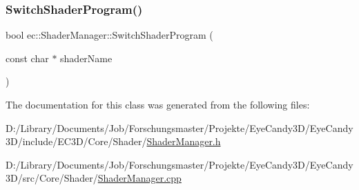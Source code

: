 \mbox{\label{classec_1_1_shader_manager_a19b4d35481ff18573de99722c62064b0}} 
\subsubsection{\texorpdfstring{Switch\+Shader\+Program()}{SwitchShaderProgram()}}
{\footnotesize\ttfamily bool ec\+::\+Shader\+Manager\+::\+Switch\+Shader\+Program (\begin{DoxyParamCaption}\item[{const char $\ast$}]{shader\+Name }\end{DoxyParamCaption})}



The documentation for this class was generated from the following files\+:\begin{DoxyCompactItemize}
\item 
D\+:/\+Library/\+Documents/\+Job/\+Forschungsmaster/\+Projekte/\+Eye\+Candy3\+D/\+Eye\+Candy3\+D/include/\+E\+C3\+D/\+Core/\+Shader/\mbox{\hyperlink{_shader_manager_8h}{Shader\+Manager.\+h}}\item 
D\+:/\+Library/\+Documents/\+Job/\+Forschungsmaster/\+Projekte/\+Eye\+Candy3\+D/\+Eye\+Candy3\+D/src/\+Core/\+Shader/\mbox{\hyperlink{_shader_manager_8cpp}{Shader\+Manager.\+cpp}}\end{DoxyCompactItemize}
